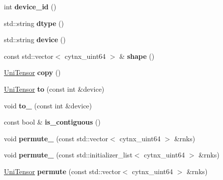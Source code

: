 \begin{DoxyCompactItemize}
int {\bfseries device\+\_\+id} ()
\item 
\mbox{\label{classcytnx_1_1UniTensor_a2eda5502ce5b139d76f1da1e6e42e19c}} 
std\+::string {\bfseries dtype} ()
\item 
\mbox{\label{classcytnx_1_1UniTensor_a10896e0d6a0aeb76b38173e75c094695}} 
std\+::string {\bfseries device} ()
\item 
\mbox{\label{classcytnx_1_1UniTensor_af77d72ff7816d6c0c7da1c2f5605e59d}} 
const std\+::vector$<$ cytnx\+\_\+uint64 $>$ \& {\bfseries shape} ()
\item 
\mbox{\label{classcytnx_1_1UniTensor_a16c6de385a175f3553adfb513cbf1081}} 
\hyperlink{classcytnx_1_1UniTensor}{Uni\+Tensor} {\bfseries copy} ()
\item 
\mbox{\label{classcytnx_1_1UniTensor_ad9a183cf5f2fdd8634420e12b093e863}} 
\hyperlink{classcytnx_1_1UniTensor}{Uni\+Tensor} {\bfseries to} (const int \&device)
\item 
\mbox{\label{classcytnx_1_1UniTensor_a9aa08f2c848cc7d31bceac7656b4a976}} 
void {\bfseries to\+\_\+} (const int \&device)
\item 
\mbox{\label{classcytnx_1_1UniTensor_a212dae7b33e323ebc5f49aa8f0fcb21e}} 
const bool \& {\bfseries is\+\_\+contiguous} ()
\item 
\mbox{\label{classcytnx_1_1UniTensor_a1ef00558c40ad9aa93251a787456ea6e}} 
void {\bfseries permute\+\_\+} (const std\+::vector$<$ cytnx\+\_\+uint64 $>$ \&rnks)
\item 
\mbox{\label{classcytnx_1_1UniTensor_ad698cb553a5cdcd7dde08d2ad69fb31a}} 
void {\bfseries permute\+\_\+} (const std\+::initializer\+\_\+list$<$ cytnx\+\_\+uint64 $>$ \&rnks)
\item 
\mbox{\label{classcytnx_1_1UniTensor_ae0286725bab36103ed7b031376d102fc}} 
\hyperlink{classcytnx_1_1UniTensor}{Uni\+Tensor} {\bfseries permute} (const std\+::vector$<$ cytnx\+\_\+uint64 $>$ \&rnks)

\end{DoxyCompactItemize}
